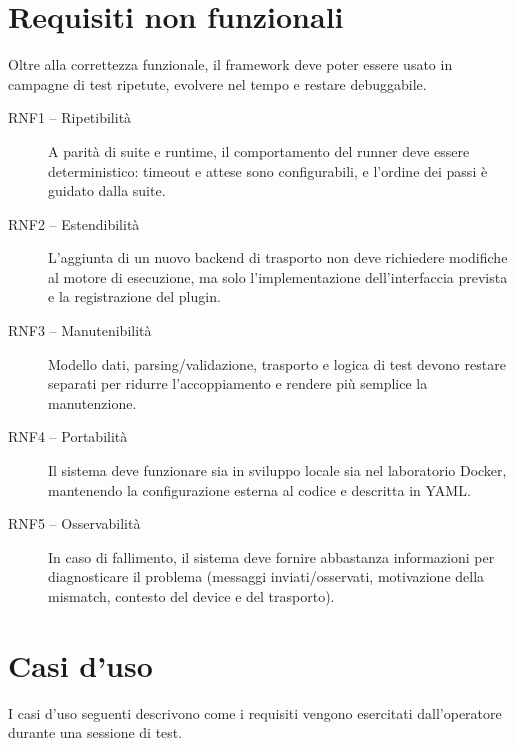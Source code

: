 \section{Requisiti non funzionali}
Oltre alla correttezza funzionale, il framework deve poter essere usato in campagne di test ripetute, evolvere nel tempo e restare debuggabile.

\begin{description}
	\item[RNF1 -- Ripetibilit\`a] A parit\`a di suite e runtime, il comportamento del runner deve essere deterministico: timeout e attese sono configurabili, e l'ordine dei passi \`e guidato dalla suite.
	\item[RNF2 -- Estendibilit\`a] L'aggiunta di un nuovo backend di trasporto non deve richiedere modifiche al motore di esecuzione, ma solo l'implementazione dell'interfaccia prevista e la registrazione del plugin.
	\item[RNF3 -- Manutenibilit\`a] Modello dati, parsing/validazione, trasporto e logica di test devono restare separati per ridurre l'accoppiamento e rendere pi\`u semplice la manutenzione.
	\item[RNF4 -- Portabilit\`a] Il sistema deve funzionare sia in sviluppo locale sia nel laboratorio Docker, mantenendo la configurazione esterna al codice e descritta in YAML.
	\item[RNF5 -- Osservabilit\`a] In caso di fallimento, il sistema deve fornire abbastanza informazioni per diagnosticare il problema (messaggi inviati/osservati, motivazione della mismatch, contesto del device e del trasporto).
\end{description}

\section{Casi d'uso}
I casi d'uso seguenti descrivono come i requisiti vengono esercitati dall'operatore durante una sessione di test.

